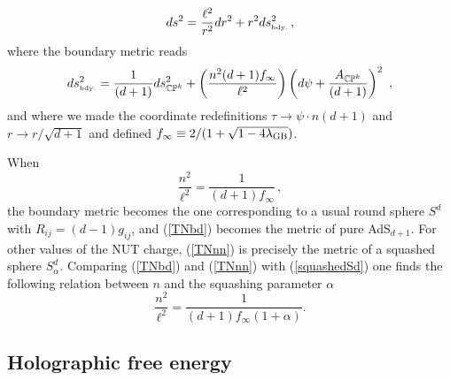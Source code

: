 \documentclass[12pt]{article}
\numberwithin{equation}{section}
\newcommand{\req}[1]{(\ref{#1})} %
\newcommand{\ssc}{\scriptscriptstyle}
\begin{document}
%
\begin{equation}\label{TNbd}
ds^2 =\frac{\ell^2 }{r^2} dr^2+r^2 ds^2_{\ssc \rm bdy.}\, ,
\end{equation}
%
where the boundary metric reads
%
\begin{equation}\label{TNnn}
ds^2_{\ssc \rm bdy.}=\frac{1}{(d+1)} ds^2_{\mathbb{CP}^{k}}+\left(\frac{n^2 (d+1)f_{\infty}}{\ell^2}\right) \left(d\psi + \frac{A_{\mathbb{CP}^{k}}}{(d+1)}\right)^2\, \, ,
\end{equation}
%
and where we made the coordinate redefinitions $\tau \rightarrow \psi \cdot n (d+1)$ and $r\rightarrow r/\sqrt{d+1}$ and defined $f_{\infty}\equiv 2/(1+\sqrt{1-4\lambda_{\rm GB}})$.

When
%
\begin{equation}\label{nl}
\frac{n^2}{\ell^2}=\frac{1}{(d+1)f_{\infty}}\, ,
\end{equation}
%
the boundary metric becomes the one corresponding to a usual round sphere $S^d$ with $R_{ij}=(d-1)g_{ij}$, and \req{TNbd} becomes the metric of pure AdS$_{d+1}$. For other values of the NUT charge, \req{TNnn} is precisely the metric of a squashed sphere $S^d_{\alpha}$. Comparing \req{TNbd} and \req{TNnn} with \req{squashedSd} one finds the following relation between $n$ and the squashing parameter $\alpha$
% 
 \begin{equation}\label{nalpharel}
  \frac{n^2}{\ell^2}=\frac{1}{(d+1)f_{\infty}(1+\alpha)}.
 \end{equation}
 
 \subsection{Holographic free energy}
 
\end{document}
